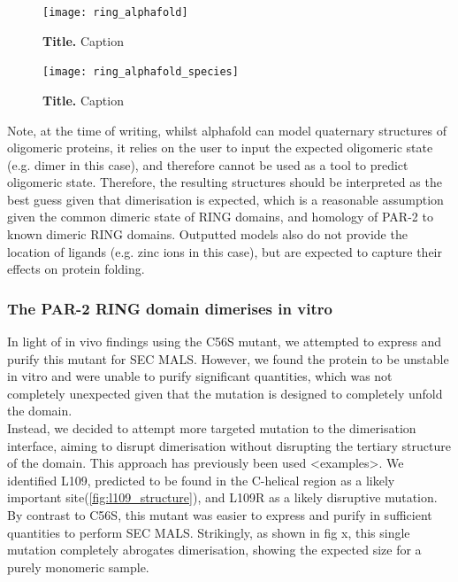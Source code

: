 \documentclass[12pt]{"article"}
\newcommand{\mycaption}[2]{\caption[#1]{\textbf{#1.} #2}}
\begin{document}
\begin{figure}[!h]
\texttt{[image: ring\_alphafold]}
\setlength{\abovecaptionskip}{20pt}
\centering
\mycaption{Title}{Caption}
\label{fig:ring_alphafold}
\end{figure}

\begin{figure}[!h]
\texttt{[image: ring\_alphafold\_species]}
\setlength{\abovecaptionskip}{20pt}
\centering
\mycaption{Title}{Caption}
\label{fig:ring_alphafold_species}
\end{figure}

Note, at the time of writing, whilst alphafold can model quaternary structures of oligomeric proteins, it relies on the user to input the expected oligomeric state (e.g. dimer in this case), and therefore cannot be used as a tool to predict oligomeric state. Therefore, the resulting structures should be interpreted as the best guess given that dimerisation is expected, which is a reasonable assumption given the common dimeric state of RING domains, and homology of PAR-2 to known dimeric RING domains. Outputted models also do not provide the location of ligands (e.g. zinc ions in this case), but are expected to capture their effects on protein folding.


\clearpage
\subsubsection{The PAR-2 RING domain dimerises in vitro}


In light of in vivo findings using the C56S mutant, we attempted to express and purify this mutant for SEC MALS. However, we found the protein to be unstable in vitro and were unable to purify significant quantities, which was not completely unexpected given that the mutation is designed to completely unfold the domain.\\

Instead, we decided to attempt more targeted mutation to the dimerisation interface, aiming to disrupt dimerisation without disrupting the tertiary structure of the domain. This approach has previously been used <examples>. We identified L109, predicted to be found in the C-helical region as a likely important site(\cref{fig:l109_structure}), and L109R as a likely disruptive mutation. By contrast to C56S, this mutant was easier to express and purify in sufficient quantities to perform SEC MALS. Strikingly, as shown in fig x, this single mutation completely abrogates dimerisation, showing the expected size for a purely monomeric sample.\\
\end{document}
